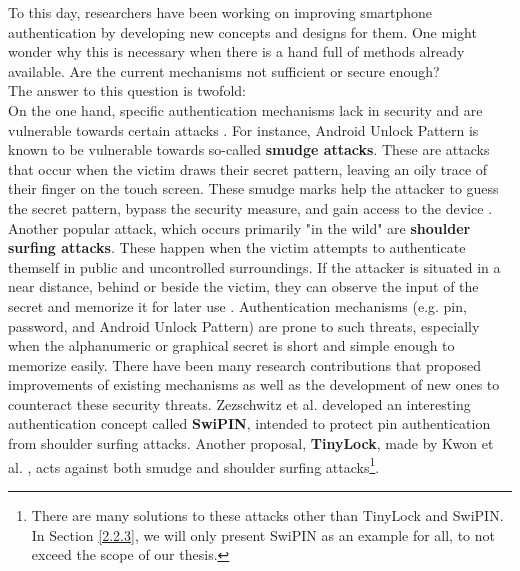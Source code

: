 To this day, researchers have been working on improving smartphone authentication by developing new concepts and designs for them. One might wonder why this is necessary when there is a hand full of methods already available. Are the current mechanisms not sufficient or secure enough? \\

The answer to this question is twofold:\\

On the one hand, specific authentication mechanisms lack in security and are vulnerable towards certain attacks \cite{Schloeglhofer}. For instance, Android Unlock Pattern is known to be vulnerable towards so-called \textbf{smudge attacks}. These are attacks that occur when the victim draws their secret pattern, leaving an oily trace of their finger on the touch screen. These smudge marks help the attacker to guess the secret pattern, bypass the security measure, and gain access to the device \cite{ediss20251}. Another popular attack, which occurs primarily "in the wild" are \textbf{shoulder surfing attacks}. These happen when the victim attempts to authenticate themself in public and uncontrolled surroundings. If the attacker is situated in a near distance, behind or beside the victim, they can observe the input of the secret and memorize it for later use \cite{ediss20251}. Authentication mechanisms (e.g. pin, password, and Android Unlock Pattern) are prone to such threats, especially when the alphanumeric or graphical secret is short and simple enough to memorize easily. There have been many research contributions that proposed improvements of existing mechanisms as well as the development of new ones to counteract these security threats. Zezschwitz et al. \cite{vonZezschwitz:2015:SFS:2702123.2702212} developed an interesting authentication concept called \textbf{SwiPIN}, intended to protect pin authentication from shoulder surfing attacks. Another proposal, \textbf{TinyLock}, made by Kwon et al. \cite{kwon}, acts against both smudge and shoulder surfing attacks\footnote{There are many solutions to these attacks other than TinyLock and SwiPIN. In Section \ref{2.2.3}, we will only present SwiPIN as an example for all, to not exceed the scope of our thesis.}.\\

